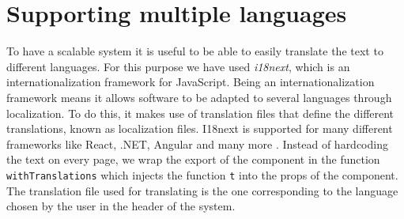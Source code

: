 \section{Supporting multiple languages}
To have a scalable system it is useful to be able to easily translate the text to different languages.
For this purpose we have used \textit{i18next}, which is an internationalization framework for JavaScript.
Being an internationalization framework means it allows software to be adapted to several languages through localization.
To do this, it makes use of translation files that define the different translations, known as localization files.
I18next is supported for many different frameworks like React, .NET, Angular and many more \cite{i18next}.
Instead of hardcoding the text on every page, we wrap the export of the component in the function \texttt{withTranslations} which injects the function \texttt{t} into the props of the component.
The translation file used for translating is the one corresponding to the language chosen by the user in the header of the system.

